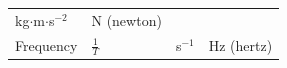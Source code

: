 {\begin{tabular}[t]{|l|l|l|l|}
        kg\begin{math}\ensuremath{\cdot}\end{math}m\begin{math}\ensuremath{\cdot}\end{math}s\begin{math}{}^{-2}\end{math} &
    
    
        N (newton)%
     \tabularnewline\cline{1-1}\cline{2-2}\cline{3-3}\cline{4-4}
    
    
        Frequency &
    
    
        
                \begin{math}\frac{1}{T}\end{math}
               &
    
    
        s\begin{math}{}^{-1}\end{math} &
    
    
        Hz (hertz)%
     \tabularnewline\cline{1-1}\cline{2-2}\cline{3-3}\cline{4-4}
    

\end{tabular}}
